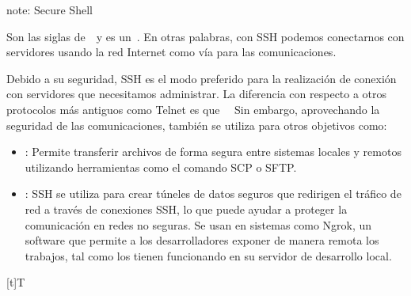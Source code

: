 \documentclass[letterpaper,10pt,spanish]{sphinxmanual}
\let\sphinxpxdimen\pdfpxdimen\else\newdimen\sphinxpxdimen
\begin{document}
\begin{sphinxadmonition}{note}{: Secure Shell}

\sphinxAtStartPar
Son las siglas de  y es un . En otras palabras, con SSH podemos conectarnos con servidores usando la red Internet como vía para las comunicaciones.

\sphinxAtStartPar
Debido a su seguridad, SSH es el modo preferido para la realización de conexión con servidores que necesitamos administrar. La diferencia con respecto a otros protocolos más antiguos como Telnet es que   Sin embargo, aprovechando la seguridad de las comunicaciones, también se utiliza para otros objetivos como:
\begin{itemize}
\item {} 
\sphinxAtStartPar
{}: Permite transferir archivos de forma segura entre sistemas locales y remotos utilizando herramientas como el comando SCP o SFTP.

\item {} 
\sphinxAtStartPar
{}: SSH se utiliza para crear túneles de datos seguros que redirigen el tráfico de red a través de conexiones SSH, lo que puede ayudar a proteger la comunicación en redes no seguras. Se usan en sistemas como Ngrok, un software que permite a los desarrolladores exponer de manera remota los trabajos, tal como los tienen funcionando en su servidor de desarrollo local.

\end{itemize}


\begin{savenotes}\sphinxattablestart
\sphinxthistablewithglobalstyle
\centering
\begin{tabulary}{\linewidth}[t]{T}
\sphinxtoprule
\sphinxtableatstartofbodyhook

\begin{sphinxfigure-in-table}
\centering
\capstart
\noindent\sphinxincludegraphics[width=400\sphinxpxdimen]{{image12}.png}
\label{\detokenize{1_guias/10informatica/G1003:id11}}\end{sphinxfigure-in-table}\relax
\\
\sphinxbottomrule
\end{tabulary}
\sphinxtableafterendhook\par
\sphinxattableend\end{savenotes}
\end{sphinxadmonition}
\end{document}

